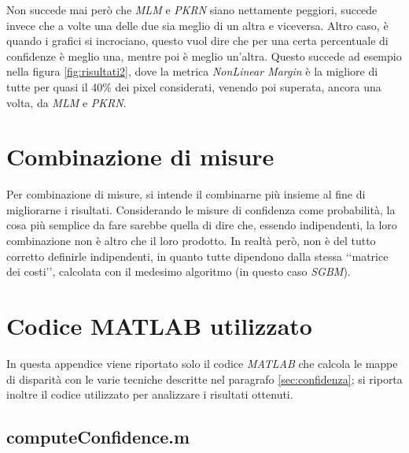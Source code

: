 \documentclass[12pt]{report}
\newcommand{\nullpage}{\newpage\null\thispagestyle{empty}}  %
\begin{document}
			\noindent Non succede mai però che \textit{MLM} e \textit{PKRN} siano nettamente peggiori, succede invece che a volte una delle due sia meglio di un altra e viceversa. Altro caso, è quando i grafici si incrociano, questo vuol dire che per una certa percentuale di confidenze è meglio una, mentre poi è meglio un'altra. Questo succede ad esempio nella figura \ref{fig:risultati2}, dove la metrica \textit{NonLinear Margin} è la migliore di tutte per quasi il 40\% dei pixel considerati, venendo poi superata, ancora una volta, da \textit{MLM} e \textit{PKRN}. 
			

			\nullpage
	
	\chapter{Combinazione di misure}
	\label{sec:combinazione}
	\pagestyle{fancy}
				
		Per combinazione di misure, si intende il combinarne più insieme al fine di migliorarne i risultati. Considerando le misure di confidenza come probabilità, la cosa più semplice da fare sarebbe quella di dire che, essendo indipendenti, la loro combinazione non è altro che il loro prodotto. In realtà però, non è del tutto corretto definirle indipendenti, in quanto tutte dipendono dalla stessa ‘‘matrice dei costi’’, calcolata con il medesimo algoritmo (in questo caso \textit{SGBM}). 
		
	
	
	
	\nullpage	
	\appendix 
	
	\chapter{Codice MATLAB utilizzato}
	\label{sec:codice}
	
		In questa appendice viene riportato solo il codice \textit{MATLAB} che calcola le mappe di disparità con le varie tecniche descritte nel paragrafo \ref{sec:confidenza}; si riporta inoltre il codice utilizzato per analizzare i risultati ottenuti.
	
		\section{computeConfidence.m}
		\label{sec:computeConfidence}
		
\end{document}
